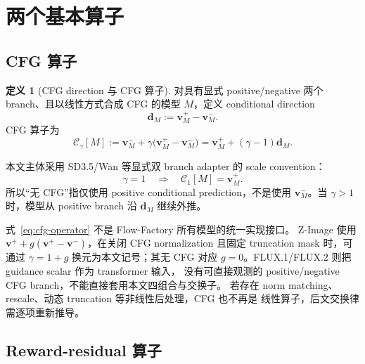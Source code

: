 \documentclass[11pt,a4paper]{article}
\newcommand{\C}{\mathcal{C}}
\newcommand{\vfield}{\bm{v}}
\newcommand{\pos}{+}
\newcommand{\negbranch}{-}
\theoremstyle{definition}
\newtheorem{definition}{定义}[section]
\theoremstyle{plain}
\begin{document}
\section{两个基本算子}

\subsection{CFG 算子}

\begin{definition}[CFG direction 与 CFG 算子]
对具有显式 positive/negative 两个 branch、且以线性方式合成 CFG 的模型
$M$，定义 conditional direction
\begin{equation}
  \bm d_M
  :=
  \vfield_M^\pos-\vfield_M^\negbranch.
  \label{eq:cfg-direction}
\end{equation}
CFG 算子为
\begin{equation}
  \C_\gamma[M]
  :=
  \vfield_M^\negbranch
  +\gamma\bigl(\vfield_M^\pos-\vfield_M^\negbranch\bigr)
  =
  \vfield_M^\pos+(\gamma-1)\bm d_M.
  \label{eq:cfg-operator}
\end{equation}
\end{definition}

本文主体采用 SD3.5/Wan 等显式双 branch adapter 的 scale convention：
\begin{equation}
  \gamma=1
  \quad\Longrightarrow\quad
  \C_1[M]=\vfield_M^\pos.
  \label{eq:no-cfg}
\end{equation}
所以``无 CFG''指仅使用 positive conditional prediction，不是使用
$\vfield_M^\negbranch$。当 $\gamma>1$ 时，模型从 positive branch 沿
$\bm d_M$ 继续外推。

\begin{tcolorbox}[
  colback=yellow!5,
  colframe=yellow!50!black,
  title=Adapter 适用范围]
式~\eqref{eq:cfg-operator} 不是 Flow-Factory 所有模型的统一实现接口。
Z-Image 使用
$\vfield^\pos+g(\vfield^\pos-\vfield^\negbranch)$，在关闭 CFG normalization
且固定 truncation mask 时，可通过 $\gamma=1+g$ 换元为本文记号；其无 CFG
对应 $g=0$。FLUX.1/FLUX.2 则把 guidance scalar 作为 transformer 输入，
没有可直接观测的 positive/negative CFG branch，不能直接套用本文四组合与交换子。
若存在 norm matching、rescale、动态 truncation 等非线性后处理，CFG 也不再是
线性算子，后文交换律需逐项重新推导。
\end{tcolorbox}

\subsection{Reward-residual 算子}
\end{document}
